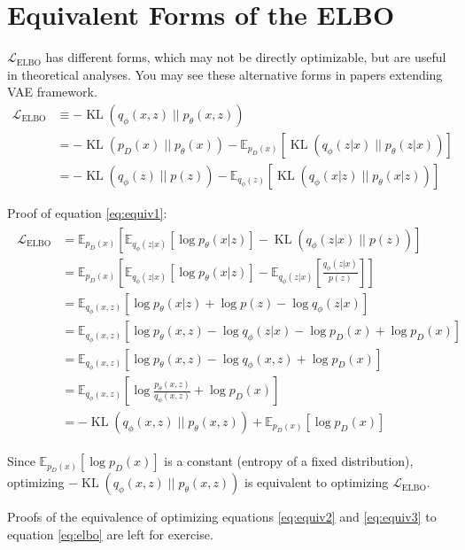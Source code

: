\documentclass{article}
\newcommand{\kl}[2]{\operatorname{KL}({#1} \; || \; {#2})}
\begin{document}
\section{Equivalent Forms of the ELBO}
$\mathcal{L}_\text{ELBO}$ has different forms, which may not be directly optimizable, but are useful in theoretical analyses. You may see these alternative forms in papers extending VAE framework.
\begin{align}
    \mathcal{L}_\text{ELBO} &\equiv -\kl{q_\phi(x, z)}{p_\theta(x, z)} \label{eq:equiv1}\\
    &= -\kl{p_D(x)}{p_\theta(x)} - \mathbb{E}_{p_D(x)}[\kl{q_\phi(z|x)}{p_\theta(z|x)}] \label{eq:equiv2}\\
    &= -\kl{q_\phi(z)}{p(z)} - \mathbb{E}_{q_\phi(z)}[\kl{q_\phi(x|z)}{p_\theta(x|z)}] \label{eq:equiv3}
\end{align}

Proof of equation \ref{eq:equiv1}:
\begin{align}
    \begin{split}
        \mathcal{L}_{\text{ELBO}} &= \mathbb{E}_{p_D(x)} \left[ \mathbb{E}_{q_\phi(z|x)}[\log p_\theta(x|z)] - \kl{q_\phi(z|x)}{p(z)} \right] \\
        &= \mathbb{E}_{p_D(x)} \left[ \mathbb{E}_{q_\phi(z|x)}[\log p_\theta(x|z)] - \mathbb{E}_{q_\phi(z|x)}[\frac{q_\phi(z|x)}{p(z)}] \right] \\
        &= \mathbb{E}_{q_\phi(x, z)} \left[ \log p_\theta(x|z) + \log p(z) - \log q_\phi(z|x) \right] \\
        &= \mathbb{E}_{q_\phi(x, z)} \left[ \log p_\theta(x, z) - \log q_\phi(z|x) - \log p_D(x) + \log p_D(x) \right] \\
        &= \mathbb{E}_{q_\phi(x, z)} \left[ \log p_\theta(x, z) - \log q_\phi(x, z) + \log p_D(x) \right] \\
        &= \mathbb{E}_{q_\phi(x, z)} \left[ \log \frac{p_\theta(x, z)}{q_\phi(x, z)} + \log p_D(x) \right] \\
        &= -\kl{q_\phi(x, z)}{p_\theta(x, z)} + \mathbb{E}_{p_D(x)} \left[ \log p_D(x) \right]
    \end{split}
\end{align}

Since $\mathbb{E}_{p_D(x)}[\log p_D(x)]$ is a constant (entropy of a fixed distribution), optimizing $-\kl{q_\phi(x, z)}{p_\theta(x, z)}$ is equivalent to optimizing $\mathcal{L}_\text{ELBO}$. 

Proofs of the equivalence of optimizing equations \ref{eq:equiv2} and \ref{eq:equiv3} to equation \ref{eq:elbo} are left for exercise.


\nocite{*}

\end{document}
